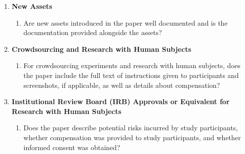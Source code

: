 \begin{enumerate}
\item {\bf New Assets}
    \begin{enumerate}
        \item Are new assets introduced in the paper well documented and is
              the documentation provided alongside the assets?
    \end{enumerate}

\item {\bf Crowdsourcing and Research with Human Subjects}
    \begin{enumerate}
        \item For crowdsourcing experiments and research with human
              subjects, does the paper include the full text of instructions
              given to participants and screenshots, if applicable, as well
              as details about compensation?
    \end{enumerate}

\item {\bf Institutional Review Board (IRB) Approvals or Equivalent for
          Research with Human Subjects}
    \begin{enumerate}
        \item Does the paper describe potential risks incurred by study
              participants, whether compensation was provided to study
              participants, and whether informed consent was obtained?
    \end{enumerate}


\end{enumerate}

